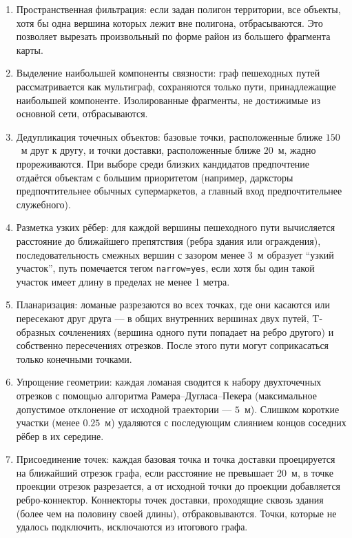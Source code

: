 \begin{enumerate}
\item Пространственная фильтрация: если задан полигон территории,
      все объекты, хотя бы одна вершина которых лежит вне полигона, отбрасываются.
      Это позволяет вырезать произвольный по форме район из большего фрагмента карты.

\item Выделение наибольшей компоненты связности: граф пешеходных путей
      рассматривается как мультиграф, сохраняются только пути, принадлежащие
      наибольшей компоненте. Изолированные фрагменты, не достижимые из
      основной сети, отбрасываются.

\item Дедупликация точечных объектов: базовые точки, расположенные ближе
      $150$~м друг к другу, и точки доставки, расположенные ближе $20$~м,
      жадно прореживаются. При выборе среди близких кандидатов предпочтение
      отдаётся объектам с большим приоритетом
      (например, дарксторы предпочтительнее обычных супермаркетов, а главный вход
      предпочтительнее служебного).

\item Разметка узких рёбер: для каждой вершины пешеходного пути
      вычисляется расстояние до ближайшего препятствия (ребра здания или ограждения),
      последовательность смежных вершин с зазором менее $3$~м образует
      \enquote{узкий участок}, путь помечается тегом \texttt{narrow=yes}, если хотя бы
      один такой участок имеет длину в пределах не менее 1 метра.

\item Планаризация: ломаные разрезаются во всех точках, где они касаются
      или пересекают друг друга --- в общих внутренних вершинах двух путей,
      T-образных сочленениях (вершина одного пути попадает на ребро другого)
      и собственно пересечениях отрезков. После этого пути могут соприкасаться
      только конечными точками.

\item Упрощение геометрии: каждая ломаная сводится к набору двухточечных
      отрезков с помощью алгоритма Рамера--Дугласа--Пекера (максимальное допустимое
      отклонение от исходной траектории --- $5$~м). Слишком короткие участки
      (менее $0.25$~м) удаляются с последующим слиянием концов соседних рёбер
      в их середине.

\item Присоединение точек: каждая базовая точка и точка доставки
      проецируется на ближайший отрезок графа, если расстояние не превышает
      $20$~м, в точке проекции отрезок разрезается, а от исходной точки до
      проекции добавляется ребро-коннектор. Коннекторы точек доставки, проходящие
      сквозь здания (более чем на половину своей длины), отбраковываются.
      Точки, которые не удалось подключить, исключаются из итогового графа.


\end{enumerate}
